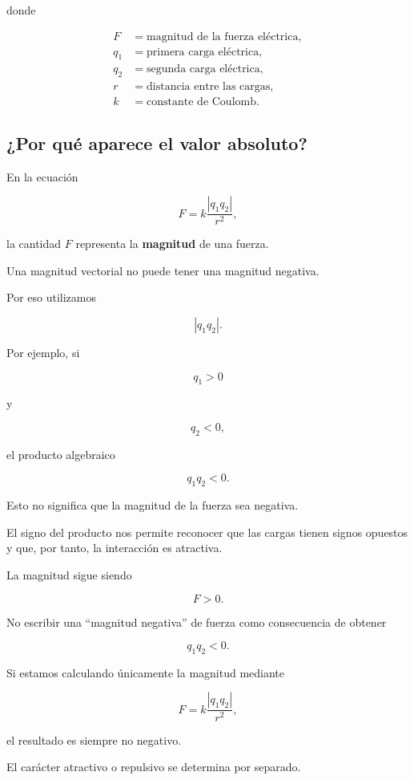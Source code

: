 donde

\begin{align*}
    F   &= \text{magnitud de la fuerza eléctrica},\\
    q_1 &= \text{primera carga eléctrica},\\
    q_2 &= \text{segunda carga eléctrica},\\
    r   &= \text{distancia entre las cargas},\\
    k   &= \text{constante de Coulomb}.
\end{align*}



\subsection{¿Por qué aparece el valor absoluto?}

En la ecuación

\[
F
=
k\frac{|q_1q_2|}{r^2},
\]

la cantidad \(F\) representa la \textbf{magnitud} de una fuerza.

Una magnitud vectorial no puede tener una magnitud negativa.

Por eso utilizamos

\[
|q_1q_2|.
\]

Por ejemplo, si

\[
q_1>0
\]

y

\[
q_2<0,
\]

el producto algebraico

\[
q_1q_2<0.
\]

Esto no significa que la magnitud de la fuerza sea negativa.

El signo del producto nos permite reconocer que las cargas tienen signos
opuestos y que, por tanto, la interacción es atractiva.

La magnitud sigue siendo

\[
F>0.
\]

\begin{errorfrecuente}

No escribir una ``magnitud negativa'' de fuerza como consecuencia de obtener

\[
q_1q_2<0.
\]

Si estamos calculando únicamente la magnitud mediante

\[
F=k\frac{|q_1q_2|}{r^2},
\]

el resultado es siempre no negativo.

El carácter atractivo o repulsivo se determina por separado.

\end{errorfrecuente}


